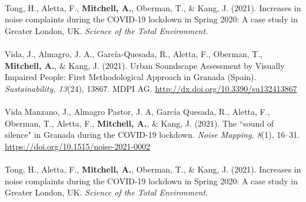 \documentclass[twoside,fontsize=11pt,titlepage,chapterprefix=true
]{scrbook}
\begin{document}
\paragraph*{}Tong, H., Aletta, F., \textbf{Mitchell, A.}, Oberman, T., \& Kang, J. (2021). Increases in noise complaints during the COVID-19 lockdown in Spring 2020: A case study in Greater London, UK. \emph{Science of the Total Environment}.

\paragraph*{}
Vida, J., Almagro, J. A., García-Quesada, R., Aletta, F., Oberman, T., \textbf{Mitchell, A.}, \& Kang, J. (2021). Urban Soundscape Assessment by Visually Impaired People: First Methodological Approach in Granada (Spain). \emph{Sustainability, 13}(24), 13867. MDPI AG. \url{http://dx.doi.org/10.3390/su132413867}

\paragraph*{}
Vida Manzano, J., Almagro Pastor, J. A, Garc\'ia Quesada, R., Aletta, F., Oberman, T., Aletta, F., \textbf{Mitchell, A.}, \& Kang, J. (2021). The ``sound of silence" in Granada during the COVID-19 lockdown. \emph{Noise Mapping, 8}(1), 16--31. \url{https://doi.org/10.1515/noise-2021-0002}

\paragraph*{}Tong, H., Aletta, F., \textbf{Mitchell, A.}, Oberman, T., \& Kang, J. (2021). Increases in noise complaints during the COVID-19 lockdown in Spring 2020: A case study in Greater London, UK. \emph{Science of the Total Environment}.










\tableofcontents
\end{document}

